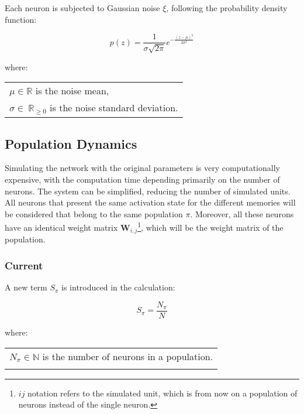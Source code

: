     Each neuron is subjected to Gaussian noise \(\xi\), following the probability density function:

        \begin{equation}
            p(z) = \frac{1}{\sigma \sqrt{ 2 \pi}} e^{ - \frac{ (z - \mu)^2 } {2 \sigma^2} }
        \label{eq:noise} \end{equation}

        where:

        \begin{tabular}{l} \\
            \(\mu \in \mathbb{R}\) is the noise mean, \\
            \(\sigma \in \
            \mathbb{R}_{\geqslant 0}\) is the noise standard deviation.
        \label{tab:conditions_noise} \end{tabular} \bigskip


\subsection{Population Dynamics}
\label{subsec:population_dynamics}

    Simulating the network with the original parameters is very computationally expensive, with the computation time depending primarily on the number of neurons.
    The system can be simplified, reducing the number of simulated units.
    All neurons that present the same activation state for the different memories will be considered that belong to the same population \(\pi\).
    Moreover, all these neurons have an identical weight matrix \(\boldsymbol{W}_{i, j}\)\footnote{\(i j\) notation refers to the simulated unit, which is from now on a population of neurons instead of the single neuron.}, which will be the weight matrix of the population.


\subsubsection{Current}

    A new term \(S_{\pi}\) is introduced in the calculation:

        \begin{equation}
            S_{\pi} = \frac{N_{\pi}}{N}
        \label{eq:fraction_neurons_pop} \end{equation}

        where:

        \begin{tabular}{l} \\
            \(N_{\pi} \in \mathbb{N}\) is the number of neurons in a population. \\
        \label{tab:fraction_neurons_pop} \end{tabular} \bigskip


